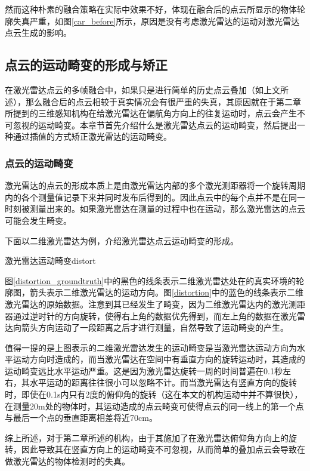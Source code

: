 然而这种朴素的融合策略在实际中效果不好，体现在融合后的点云所显示的物体轮廓失真严重，如图\ref{car_before}所示，原因是没有考虑激光雷达的运动对激光雷达点云生成的影响。

\subsection{点云的运动畸变的形成与矫正}
在激光雷达点云的多帧融合中，如果只是进行简单的历史点云叠加（如上文所述），那么融合后的点云相较于真实情况会有很严重的失真，其原因就在于第二章所提到的三维感知机构在给激光雷达在偏航角方向上的往复运动时，点云会产生不可忽视的运动畸变。本章节首先介绍什么是激光雷达点云的运动畸变，然后提出一种通过插值的方式矫正激光雷达的运动畸变。

\subsubsection{点云的运动畸变}
激光雷达的点云的形成本质上是由激光雷达内部的多个激光测距器将一个旋转周期内的各个测量值记录下来并同时发布后得到的。因此点云中的每个点并不是在同一时刻被测量出来的。如果激光雷达在测量的过程中也在运动，那么激光雷达的点云可能会发生畸变。

下面以二维激光雷达为例，介绍激光雷达点云运动畸变的形成。
\begin{pics}[htbp]{激光雷达运动畸变}{distort}
\end{pics}
图\ref{distortion_groundtruth}中的黑色的线条表示二维激光雷达处在的真实环境的轮廓图，箭头表示二维激光雷达的运动方向。图\ref{distortion}中的蓝色的线条表示二维激光雷达的原始数据。注意到其已经发生了畸变，因为二维激光雷达内的激光测距器通过逆时针的方向旋转，使得右上角的数据优先得到，而左上角的数据在激光雷达向箭头方向运动了一段距离之后才进行测量，自然导致了运动畸变的产生。

值得一提的是上图表示的二维激光雷达发生的运动畸变是当激光雷达运动方向为水平运动方向时造成的，而当激光雷达在空间中有垂直方向的旋转运动时，其造成的运动畸变远比水平运动严重。这是因为激光雷达旋转一周的时间普遍在0.1秒左右，其水平运动的距离往往很小可以忽略不计。而当激光雷达有竖直方向的旋转时，即使在0.1s内只有2度的俯仰角的旋转（这在本文的机构运动中并不算很快），在测量20m处的物体时，其运动造成的点云畸变可使得点云的同一线上的第一个点与最后一个点的垂直距离相差将近70cm。

综上所述，对于第二章所述的机构，由于其施加了在激光雷达俯仰角方向上的旋转，因此导致其在竖直方向上的运动畸变不可忽视，从而简单的叠加点云会导致在做激光雷达的物体检测时的失真。

